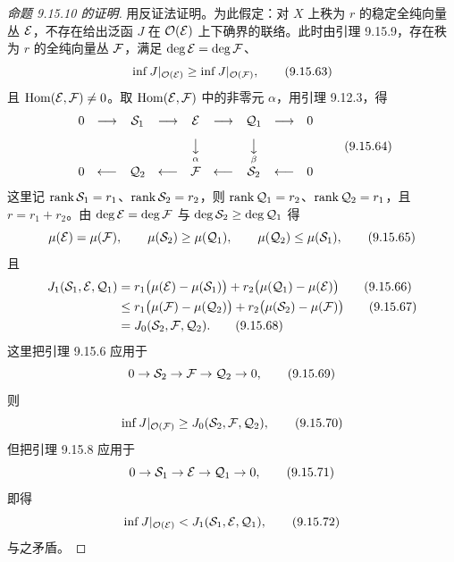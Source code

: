 \begin{proof}[命题 9.15.10 的证明]
  用反证法证明。为此假定：对 $X$ 上秩为 $r$ 的稳定全纯向量丛 $\mathcal{E}$，不存在给出泛函 $J$ 在 $\mathcal{O}(\mathcal{E})$ 上下确界的联络。此时由引理 9.15.9，存在秩为 $r$ 的全纯向量丛 $\mathcal{F}$，满足 $\deg\mathcal{E}=\deg\mathcal{F}$、
  \begin{equation}
    \inf J|_{\mathcal{O}(\mathcal{E})}\ge\inf J|_{\mathcal{O}(\mathcal{F})},
    \tag{9.15.63}
  \end{equation}
  且 $\operatorname{Hom}(\mathcal{E},\mathcal{F})\ne0$。取 $\operatorname{Hom}(\mathcal{E},\mathcal{F})$ 中的非零元 $\alpha$，用引理 9.12.3，得
  \begin{equation}
    \begin{array}{ccccccccc}
      0&\longrightarrow&\mathcal{S}_1&\longrightarrow&\mathcal{E}&\longrightarrow&\mathcal{Q}_1&\longrightarrow&0\\[8pt]
      &&&&\underset{\alpha}{\big\downarrow}&&\underset{\beta}{\big\downarrow}&&\\[8pt]
      0&\longleftarrow&\mathcal{Q}_2&\longleftarrow&\mathcal{F}&\longleftarrow&\mathcal{S}_2&\longleftarrow&0
    \end{array}
    \tag{9.15.64}
  \end{equation}
  这里记 $\operatorname{rank}\mathcal{S}_1=r_1$、$\operatorname{rank}\mathcal{S}_2=r_2$，则 $\operatorname{rank}\mathcal{Q}_1=r_2$、$\operatorname{rank}\mathcal{Q}_2=r_1$，且 $r=r_1+r_2$。由 $\deg\mathcal{E}=\deg\mathcal{F}$ 与 $\deg\mathcal{S}_2\ge\deg\mathcal{Q}_1$ 得
  \begin{equation}
    \mu(\mathcal{E})=\mu(\mathcal{F}),\qquad \mu(\mathcal{S}_2)\ge\mu(\mathcal{Q}_1),\qquad \mu(\mathcal{Q}_2)\le\mu(\mathcal{S}_1),
    \tag{9.15.65}
  \end{equation}
  且
  \begin{align}
    J_1(\mathcal{S}_1,\mathcal{E},\mathcal{Q}_1)&=r_1\bigl(\mu(\mathcal{E})-\mu(\mathcal{S}_1)\bigr)+r_2\bigl(\mu(\mathcal{Q}_1)-\mu(\mathcal{E})\bigr)
    \tag{9.15.66}\\
    &\le r_1\bigl(\mu(\mathcal{F})-\mu(\mathcal{Q}_2)\bigr)+r_2\bigl(\mu(\mathcal{S}_2)-\mu(\mathcal{F})\bigr)
    \tag{9.15.67}\\
    &=J_0(\mathcal{S}_2,\mathcal{F},\mathcal{Q}_2).
    \tag{9.15.68}
  \end{align}
  这里把引理 9.15.6 应用于
  \begin{equation}
    0\to\mathcal{S}_2\to\mathcal{F}\to\mathcal{Q}_2\to0,
    \tag{9.15.69}
  \end{equation}
  则
  \begin{equation}
    \inf J|_{\mathcal{O}(\mathcal{F})}\ge J_0(\mathcal{S}_2,\mathcal{F},\mathcal{Q}_2),
    \tag{9.15.70}
  \end{equation}
  但把引理 9.15.8 应用于
  \begin{equation}
    0\to\mathcal{S}_1\to\mathcal{E}\to\mathcal{Q}_1\to0,
    \tag{9.15.71}
  \end{equation}
  即得
  \begin{equation}
    \inf J|_{\mathcal{O}(\mathcal{E})}<J_1(\mathcal{S}_1,\mathcal{E},\mathcal{Q}_1),
    \tag{9.15.72}
  \end{equation}
  与之矛盾。
\end{proof}

